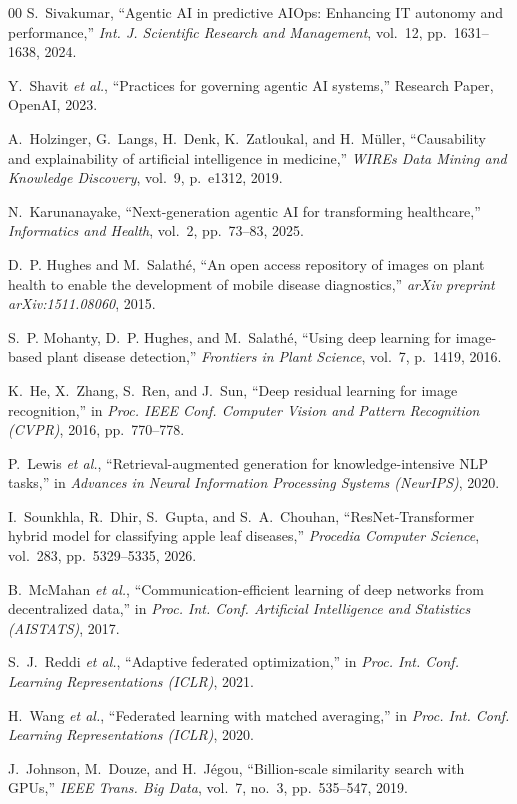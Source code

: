 \documentclass[conference]{IEEEtran}
\begin{document}
\begin{thebibliography}{00}
 S.~Sivakumar, ``Agentic AI in predictive AIOps: Enhancing IT autonomy and performance,'' \emph{Int. J. Scientific Research and Management}, vol.~12, pp.~1631--1638, 2024.

 Y.~Shavit \emph{et al.}, ``Practices for governing agentic AI systems,'' Research Paper, OpenAI, 2023.

 A.~Holzinger, G.~Langs, H.~Denk, K.~Zatloukal, and H.~M\"uller, ``Causability and explainability of artificial intelligence in medicine,'' \emph{WIREs Data Mining and Knowledge Discovery}, vol.~9, p.~e1312, 2019.

 N.~Karunanayake, ``Next-generation agentic AI for transforming healthcare,'' \emph{Informatics and Health}, vol.~2, pp.~73--83, 2025.

 D.~P. Hughes and M.~Salath\'e, ``An open access repository of images on plant health to enable the development of mobile disease diagnostics,'' \emph{arXiv preprint arXiv:1511.08060}, 2015.

 S.~P. Mohanty, D.~P. Hughes, and M.~Salath\'e, ``Using deep learning for image-based plant disease detection,'' \emph{Frontiers in Plant Science}, vol.~7, p.~1419, 2016.

 K.~He, X.~Zhang, S.~Ren, and J.~Sun, ``Deep residual learning for image recognition,'' in \emph{Proc. IEEE Conf. Computer Vision and Pattern Recognition (CVPR)}, 2016, pp.~770--778.

 P.~Lewis \emph{et al.}, ``Retrieval-augmented generation for knowledge-intensive NLP tasks,'' in \emph{Advances in Neural Information Processing Systems (NeurIPS)}, 2020.

 I.~Sounkhla, R.~Dhir, S.~Gupta, and S.~A.~Chouhan, ``ResNet-Transformer hybrid model for classifying apple leaf diseases,'' \emph{Procedia Computer Science}, vol.~283, pp.~5329--5335, 2026.

 B.~McMahan \emph{et al.}, ``Communication-efficient learning of deep networks from decentralized data,'' in \emph{Proc. Int. Conf. Artificial Intelligence and Statistics (AISTATS)}, 2017.

 S.~J.~Reddi \emph{et al.}, ``Adaptive federated optimization,'' in \emph{Proc. Int. Conf. Learning Representations (ICLR)}, 2021.

 H.~Wang \emph{et al.}, ``Federated learning with matched averaging,'' in \emph{Proc. Int. Conf. Learning Representations (ICLR)}, 2020.

 J.~Johnson, M.~Douze, and H.~J\'egou, ``Billion-scale similarity search with GPUs,'' \emph{IEEE Trans. Big Data}, vol.~7, no.~3, pp.~535--547, 2019.

\end{thebibliography}
\end{document}
